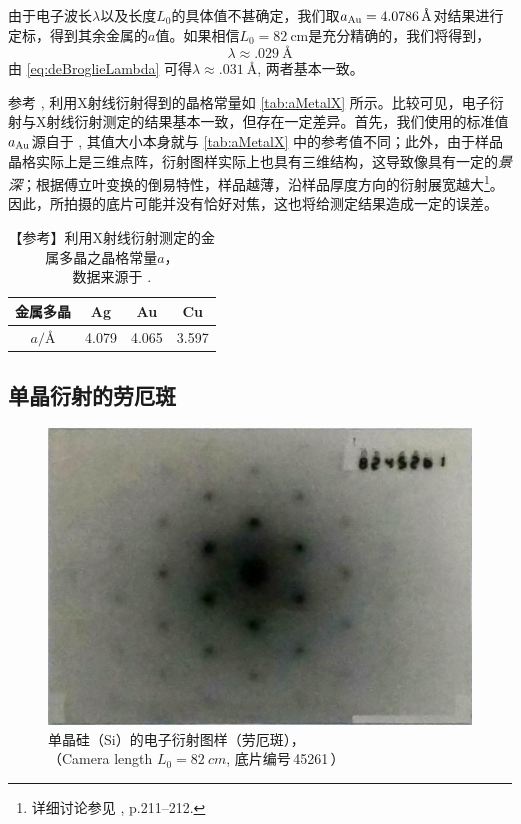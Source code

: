 \documentclass[aps,pre,12pt,preprint,%
	onecolumn,showpacs,showkeys,nofootinbib]{revtex4-1}
\begin{document}
	由于电子波长$\lambda$以及长度$L_0$的具体值不甚确定，我们取$a_{\textup{Au}} = \SI{4.0786}{\angstrom}$对结果进行定标，得到其余金属的$a$值。如果相信$L_0 = \SI{82}{\cm}$是充分精确的，我们将得到，
	\begin{equation}
		\lambda \approx \SI{.029}{\angstrom}
	\end{equation}
	由 \eqref{eq:deBroglieLambda} 可得$\lambda \approx \SI{.031}{\angstrom}$, 两者基本一致。
	
	参考 \cite{PhysRev.25.753}, 利用X射线衍射得到的晶格常量如 \autoref{tab:aMetalX} 所示。比较可见，电子衍射与X射线衍射测定的结果基本一致，但存在一定差异。首先，我们使用的标准值$a_{\textup{Au}}$源自于 \cite{textbook}, 其值大小本身就与 \autoref{tab:aMetalX} 中的参考值不同；此外，由于样品晶格实际上是三维点阵，衍射图样实际上也具有三维结构，这导致像具有一定的\textit{景深}；根据傅立叶变换的倒易特性，样品越薄，沿样品厚度方向的衍射展宽越大\footnote{%
		详细讨论参见 \cite{textbook}, p.\numrange{211}{212}. 
		}。因此，所拍摄的底片可能并没有恰好对焦，这也将给测定结果造成一定的误差。
	
	\begin{table}[!ht]
	  \caption{【参考】利用X射线衍射测定的金属多晶之晶格常量$a$，\\
	  	数据来源于 \cite{PhysRev.25.753}. }
	\begin{tabularx}{.6\linewidth}{*4{C{1}}}
	\toprule\midrule
		金属多晶 & Ag & Au & Cu \\
	\midrule
		$a / \si{\angstrom}$ & 4.079 & 4.065 & 3.597 \\
	\midrule\bottomrule
	\end{tabularx}
	\label{tab:aMetalX}
	\vspace{-3ex}
	\end{table}
\subsection{单晶衍射的劳厄斑}
	\begin{figure}[!ht]
	\centering
	\includegraphics[width=.7\linewidth]{LaueSpots}
	\caption{单晶硅（Si）的电子衍射图样（劳厄斑），\\
		（Camera length $L_0 = \SI{82}{cm}$, 
		底片编号\textnumero\,45261\,）}
	\label{fig:LaueRings}
	\end{figure}
	
\end{document}
